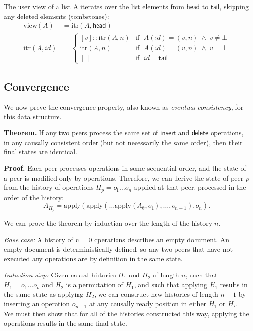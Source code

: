 \documentclass[a4paper,twocolumn,10pt]{article}
\begin{document}
The user view of a list A iterates over the list elements from $\mathsf{head}$ to $\mathsf{tail}$, skipping any deleted elements (tombstones):
\begin{align*}
\mathrm{view}(A) &= \mathrm{itr}(A, \mathsf{head}) \\
\mathrm{itr}(A, \mathit{id}) &= \begin{cases}
    [v] \mathbin{::} \mathrm{itr}(A, n) & \text{if }\; A(\mathit{id}) = (v, n) \;\wedge\; v \neq \bot \\
                     \mathrm{itr}(A, n) & \text{if }\; A(\mathit{id}) = (v, n) \;\wedge\; v = \bot \\
    [\,] & \text{if }\; \mathit{id} = \mathsf{tail}
\end{cases}
\end{align*}

\subsection{Convergence}

We now prove the convergence property, also known as \emph{eventual consistency}, for this data structure.

\textbf{Theorem.} If any two peers process the same set of $\mathsf{insert}$ and $\mathsf{delete}$ operations, in any causally consistent order (but not necessarily the same order), then their final states are identical.

\textbf{Proof.} Each peer processes operations in some sequential order, and the state of a peer is modified only by operations. Therefore, we can derive the state of peer $p$ from the history of operations $H_p=o_1 \dots o_n$ applied at that peer, processed in the order of the history:
$$ A_{H_p} = \mathrm{apply}(\mathrm{apply}(\dots \mathrm{apply}(A_\emptyset, o_1), \dots, o_{n-1}), o_n). $$

We can prove the theorem by induction over the length of the history $n$.

\emph{Base case:} A history of $n=0$ operations describes an empty document. An empty document is deterministically defined, so any two peers that have not executed any operations are by definition in the same state.

\emph{Induction step:} Given causal histories $H_1$ and $H_2$ of length $n$, such that $H_1=o_1 \dots o_n$ and $H_2$ is a permutation of $H_1$, and such that applying $H_1$ results in the same state as applying $H_2$, we can construct new histories of length $n+1$ by inserting an operation $o_{n+1}$ at any causally ready position in either $H_1$ or $H_2$. We must then show that for all of the histories constructed this way, applying the operations results in the same final state.
\end{document}
